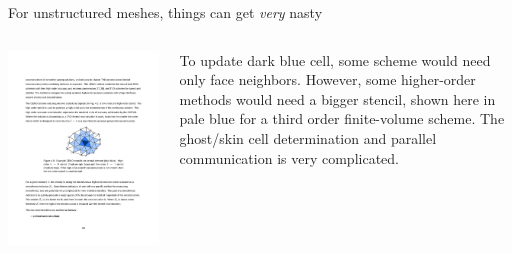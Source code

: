 \documentclass[aspectratio=169]{beamer}
\begin{document}
\begin{frame}{For unstructured meshes, things can get \emph{very}
    nasty}

  \begin{columns}
    
    \begin{column}{0.4\linewidth}
      \includegraphics[width=1.0\linewidth]{unstruct-stencil.pdf}
    \end{column}
    
    \begin{column}{0.6\linewidth}
      To update dark blue cell, some scheme would need only face
      neighbors. However, some higher-order methods would need a
      bigger stencil, shown here in pale blue for a third order
      finite-volume scheme. The ghost/skin cell determination and
      parallel communication is very complicated.
    \end{column}
  \end{columns}

\end{frame}
\end{document}
